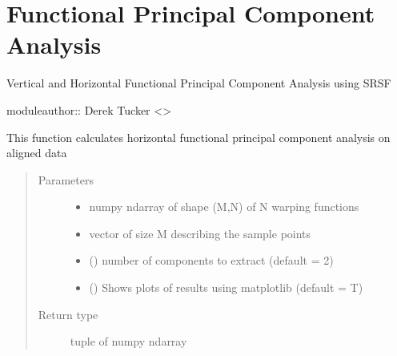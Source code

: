 \documentclass[letterpaper,10pt,english]{sphinxmanual}
\begin{document}
\chapter{Functional Principal Component Analysis}
\label{\detokenize{fPCA:module-fPCA}}\label{\detokenize{fPCA:functional-principal-component-analysis}}\label{\detokenize{fPCA::doc}}
Vertical and Horizontal Functional Principal Component Analysis using SRSF

moduleauthor:: Derek Tucker \textless{}\textgreater{}

\begin{fulllineitems}
\label{\detokenize{fPCA:fPCA.horizfPCA}}
This function calculates horizontal functional principal component analysis on aligned data
\begin{quote}\begin{description}
\item[{Parameters}] \leavevmode\begin{itemize}
\item {} 
 \textendash{} numpy ndarray of shape (M,N) of N warping functions

\item {} 
 \textendash{} vector of size M describing the sample points

\item {} 
 () \textendash{} number of components to extract (default = 2)

\item {} 
 () \textendash{} Shows plots of results using matplotlib (default = T)

\end{itemize}

\item[{Return type}] \leavevmode
tuple of numpy ndarray


\end{description}
\end{quote}
\end{fulllineitems}
\end{document}
